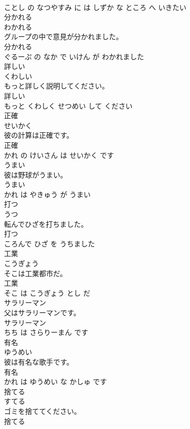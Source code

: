 \documentclass[8pt]{extreport}
\begin{document}
\begin{CJK}{UTF8}{min}
\\	ことし の なつやすみ に は しずか な ところ へ いきたい			
\\	分かれる	
\\	わかれる			
\\	グループの中で意見が分かれました。	
\\	分かれる 
\\	ぐるーぷ の なか で いけん が わかれました			
\\	詳しい	
\\	くわしい			
\\	もっと詳しく説明してください。	
\\	詳しい 
\\	もっと くわしく せつめい して ください			
\\	正確	
\\	せいかく			
\\	彼の計算は正確です。	
\\	正確 
\\	かれ の けいさん は せいかく です			
\\	うまい	
\\	彼は野球がうまい。	
\\	うまい 
\\	かれ は やきゅう が うまい			
\\	打つ	
\\	うつ			
\\	転んでひざを打ちました。	
\\	打つ 
\\	ころんで ひざ を うちました			
\\	工業	
\\	こうぎょう			
\\	そこは工業都市だ。	
\\	工業 
\\	そこ は こうぎょう とし だ			
\\	サラリーマン	
\\	父はサラリーマンです。	
\\	サラリーマン 
\\	ちち は さらりーまん です			
\\	有名	
\\	ゆうめい			
\\	彼は有名な歌手です。	
\\	有名 
\\	かれ は ゆうめい な かしゅ です			
\\	捨てる	
\\	すてる			
\\	ゴミを捨ててください。	
\\	捨てる 

\end{CJK}
\end{document}
